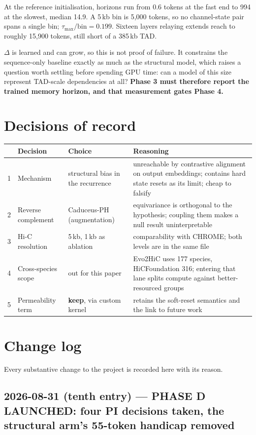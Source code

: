 \documentclass[11pt,a4paper]{article}
\begin{document}
At the reference initialisation, horizons run from 0.6 tokens at the fast end to
994 at the slowest, median 14.9. A 5\,kb bin is 5{,}000 tokens, so no
channel-state pair spans a single bin; $\tau_{\max}/\text{bin} = 0.199$. Sixteen
layers relaying extends reach to roughly 15{,}900 tokens, still short of a
385\,kb TAD.

$\Delta$ is learned and can grow, so this is not proof of failure. It constrains
the sequence-only baseline exactly as much as the structural model, which raises
a question worth settling before spending GPU time: can a model of this size
represent TAD-scale dependencies at all? \textbf{Phase 3 must therefore report
the trained memory horizon, and that measurement gates Phase 4.}

\section{Decisions of record}

\begin{longtable}{@{}clp{4.2cm}p{5.2cm}@{}}
\toprule
& Decision & Choice & Reasoning \\
\midrule
\endhead
1 & Mechanism & structural bias in the recurrence & unreachable by contrastive alignment on output embeddings; contains hard state resets as its limit; cheap to falsify \\
2 & Reverse complement & Caduceus-PH (augmentation) & equivariance is orthogonal to the hypothesis; coupling them makes a null result uninterpretable \\
3 & Hi-C resolution & 5\,kb, 1\,kb as ablation & comparability with CHROME; both levels are in the same file \\
4 & Cross-species scope & out for this paper & Evo2HiC uses 177 species, HiCFoundation 316; entering that lane splits compute against better-resourced groups \\
5 & Permeability term & \textbf{keep}, via custom kernel & retains the soft-reset semantics and the link to future work \\
\bottomrule
\end{longtable}

\section{Change log}

Every substantive change to the project is recorded here with its reason.

\subsection*{2026-08-31 (tenth entry) --- PHASE D LAUNCHED: four PI decisions
taken, the structural arm's 55-token handicap removed}
\end{document}

